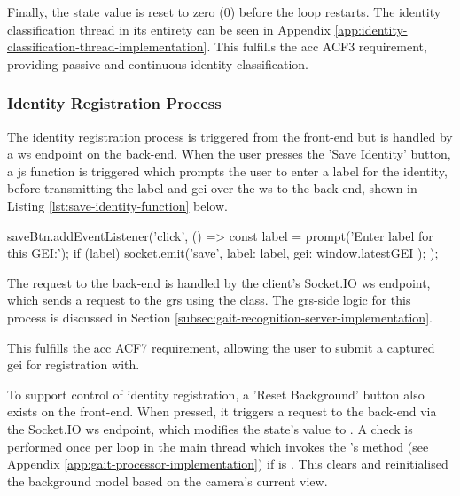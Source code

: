 Finally, the  state value is reset to zero (0) before the loop restarts.
The identity classification thread in its entirety can be seen in Appendix \ref{app:identity-classification-thread-implementation}.
This fulfills the \ac{acc} ACF3 requirement, providing passive and continuous identity classification.

\subsubsection{Identity Registration Process}
\label{subsubsec:identity-registration-process}

The identity registration process is triggered from the front-end but is handled by a \ac{ws} endpoint on the back-end.
When the user presses the 'Save Identity' button, a \ac{js} function is triggered which prompts the user to enter a label for the identity, before transmitting the label and \ac{gei} over the \ac{ws} to the back-end,
shown in Listing \ref{lst:save-identity-function} below.

\begin{code}[minted language=javascript]
saveBtn.addEventListener('click', () => {
	const label = prompt('Enter label for this GEI:');
	if (label) {
		socket.emit('save', { label: label, gei: window.latestGEI });
	}
});
\end{code}
\caption{JavaScript Button-Click Handler for Saving \ac{gei}-based Identity}
\label{lst:save-identity-function}

The request to the back-end is handled by the client's  Socket.IO \ac{ws} endpoint, which sends a  request  to the \ac{grs} using the  class.
The \ac{grs}-side logic for this process is discussed in Section \ref{subsec:gait-recognition-server-implementation}.

This fulfills the \ac{acc} ACF7 requirement, allowing the user to submit a captured \ac{gei} for registration with.

To support control of identity registration, a 'Reset Background' button also exists on the front-end.
When pressed, it triggers a  request to the back-end via the  Socket.IO \ac{ws} endpoint, which modifies the state's  value to .
A check is performed once per loop in the main thread which invokes the 's  method (see Appendix \ref{app:gait-processor-implementation}) if  is . 
This clears and reinitialised the background model based on the camera's current view.

